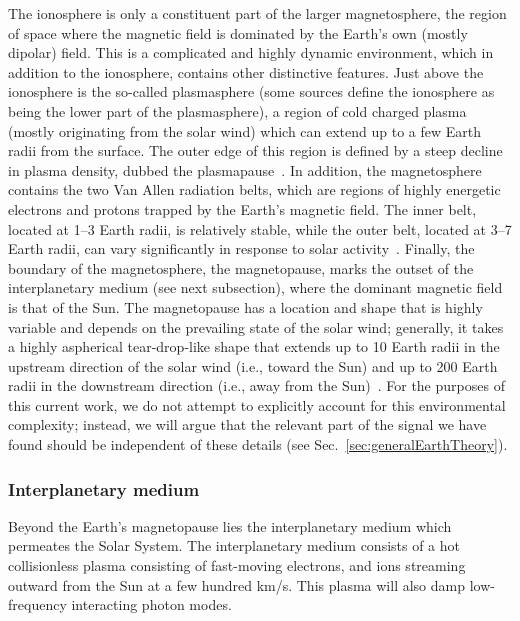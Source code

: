 \documentclass[amsmath,amssymb,aps,10pt,prd,letterpaper,nofootinbib,balancelastpage,notitlepage,superscriptaddress,twocolumn,floatfix]{revtex4-2}
\newcommand{\secref}[2][]{Sec{#1}.~\ref{#2}}		%
\begin{document}
The ionosphere is only a constituent part of the larger magnetosphere, the region of space where the magnetic field is dominated by the Earth's own (mostly dipolar) field.
This is a complicated and highly dynamic environment, which in addition to the ionosphere, contains other distinctive features.
Just above the ionosphere is the so-called plasmasphere (some sources define the ionosphere as being the lower part of the plasmasphere), a region of cold charged plasma (mostly originating from the solar wind) which can extend up to a few Earth radii from the surface.
The outer edge of this region is defined by a steep decline in plasma density, dubbed the plasmapause~\cite{LaaksoJarva}.
In addition, the magnetosphere contains the two Van Allen radiation belts, which are regions of highly energetic electrons and protons trapped by the Earth's magnetic field.
The inner belt, located at 1--3 Earth radii, is relatively stable, while the outer belt, located at 3--7 Earth radii, can vary significantly in response to solar activity~\cite{Ganushkina}.
Finally, the boundary of the magnetosphere, the magnetopause, marks the outset of the interplanetary medium (see next subsection), where the dominant magnetic field is that of the Sun.
The magnetopause has a location and shape that is highly variable and depends on the prevailing state of the solar wind; generally, it takes a highly aspherical tear-drop-like shape that extends up to 10 Earth radii in the upstream direction of the solar wind (i.e., toward the Sun) and up to 200 Earth radii in the downstream direction (i.e., away from the Sun)~\cite{ShueSong,SibeckLin}.
For the purposes of this current work, we do not attempt to explicitly account for this environmental complexity; instead, we will argue that the relevant part of the signal we have found should be independent of these details (see \secref{sec:generalEarthTheory}).


\subsubsection{Interplanetary medium}
\label{sec:interplanetaryMedium}

Beyond the Earth's magnetopause lies the interplanetary medium which permeates the Solar System.
The interplanetary medium consists of a hot collisionless plasma consisting of fast-moving electrons, and ions streaming outward from the Sun at a few hundred km/s.
This plasma will also damp low-frequency interacting photon modes.
\end{document}
